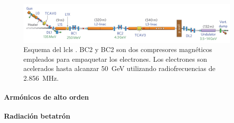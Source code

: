 \begin{figure}[htbp]
  \centering
  \includegraphics[width=\textwidth]{Figuras/ch1_lcls.png}
  \caption{Esquema del \acrshort{lcls} \autocite{Emma2010}. BC2 y BC2 son dos compresores magnéticos empleados para empaquetar los electrones. Los electrones son acelerados hasta alcanzar \qty{50}{GeV} utilizando radiofrecuencias de \qty{2,856}{MHz}.}
  \label{fig:1.18}
\end{figure}

\paragraph{Armónicos de alto orden}
 
\paragraph{Radiación betatrón}

%

